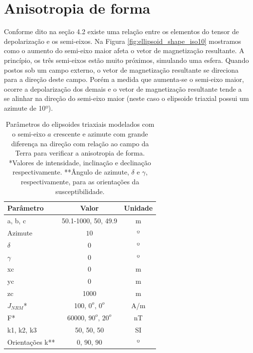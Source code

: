 \section{Anisotropia de forma}

Conforme dito na seção 4.2 existe uma relação entre os elementos do tensor de depolarização e os semi-eixos. Na Figura \ref{fig:ellipsoid_shape_iso10} mostramos como o aumento do semi-eixo maior afeta o vetor de magnetização resultante. A princípio, os três semi-eixos estão muito próximos, simulando uma esfera. Quando postos sob um campo externo, o vetor de magnetização resultante se direciona para a direção deste campo. Porém a medida que aumenta-se o semi-eixo maior, ocorre a depolarização dos demais e o vetor de magnetização resultante tende a se alinhar na direção do semi-eixo maior (neste caso o elipsoide triaxial possui um azimute de 10$º$).

\vspace{2cm}

\begin{table}[h!]
	\begin{center}
		\begin{tabular}{|l|c|c|}
			\hline
			\textbf{Parâmetro}  & \textbf{Valor}  & \textbf{Unidade }\\
			\hline 
			a, b, c  & 50.1-1000, 50, 49.9 & m\\
			\hline
			Azimute   & $10$ & º \\
			\hline
			$\delta$    & $0$ & º\\
			\hline
			$\gamma$   & $0$  & º\\
			\hline
			xc   & 0  & m\\
			\hline          
			yc   & 0  & m\\
			\hline                
			zc   & 1000  & m\\
			\hline
			$J_{NRM}$*  & 100, $0^o$, $0^o$ & A/m \\
			\hline
			F*    & 60000, $90^o$, $20^o$ & nT\\
			\hline
			k1, k2, k3   & 50, 50, 50  & SI\\
			\hline
			Orientações k**   & $0$, $90$, $90$  & º\\
			\hline
		\end{tabular}
		\caption{Parâmetros do elipsoides triaxiais modelados com o semi-eixo $a$ crescente e azimute com grande diferença na direção com relação ao campo da Terra para verificar a anisotropia de forma. *Valores de intensidade, inclinação e declinação respectivamente. **Ângulo de azimute, $\delta$ e $\gamma$, respectivamente, para as orientações da susceptibilidade.}
	\end{center}
	\label{tab:ellipsoid_shape_iso10}
\end{table}

